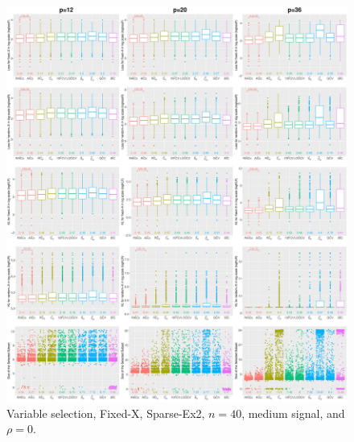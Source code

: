 \begin{figure}[!ht]
\centering
\includegraphics[width=\textwidth]{figures/supplement/fixedx/subset_selection/Sparse-Ex2_n40_msnr_rho0.eps}
\caption{Variable selection, Fixed-X, Sparse-Ex2, $n=40$, medium signal, and $\rho=0$.}
\end{figure}
\clearpage

